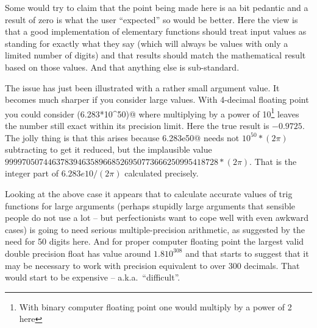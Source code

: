 Some would try to claim that the point being made here is aa bit pedantic
and a result of zero is what the user ``expected'' so would be better.
Here the view is that a good implementation of elementary functions should
treat input values as standing for exactly what they say (which will
always be values with only a limited number of digits) and that results
should match the mathematical result based on those values. And that
anything else is sub-standard.

The issue has just been illustrated with a rather small argument value. It
becomes much sharper if you consider large values. With 4-decimal
floating point you could consider \verb@sin(6.283*10^50)@ where
multiplying by a power of 10\footnote{With binary computer floating point
one would multiply by a power of 2 here} leaves the number still
exact within its precision limit. Here the true result is
$-0.9725$. The jolly thing is that this arises because \verb@6.283e50@ needs
not $10^50 *(2 \pi)$ subtracting to get it reduced, but the implausible
value $99997050744637839463589668526950773666250995418728*(2 \pi)$.
That is the integer part of $6.283e10 / (2 \pi)$ calculated precisely.

Looking at the above case it appears that to calculate accurate values
of trig functions for large arguments (perhaps stupidly large arguments that
sensible people do not use a lot -- but perfectionists want to cope well with
even awkward cases) is going to need serious multiple-precision arithmetic,
as suggested by the need for 50 digits here. And for proper computer
floating point the largest valid double precision float has value around
$1.8 10^{308}$ and that starts to suggest that it may be necessary to
work with precision equivalent to over 300 decimals. That would start to
be expensive -- a.k.a.\ ``difficult''.

